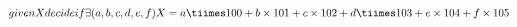 \documentclass{article}
\begin{document}
\begin{math}
given X \\
decide if \\
\exists (a,b,c,d,e,f) \\
X = a \tiimes 100 + b \times 101 + c \times 102 + d \tiimes 103 + e \times 104 + f \times 105
\end{math}
\end{document}
